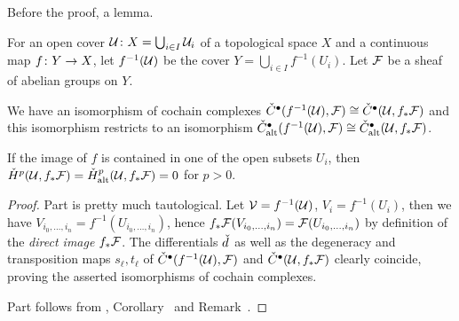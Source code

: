 \documentclass[a4paper,parskip=half,numbers=enddot, DIV=12]{scrreprt}
\begin{document}
Before the proof, a lemma.
\begin{lem}
	For an open cover $\mathcal{U}\colon X=\bigcup_{i\in I}\mathcal{U}_i$ of a topological space $X$ and a continuous map $f\colon Y\morphism X$, let $f^{-1}(\mathcal{U})$ be the cover $Y=\bigcup_{i\in I}f^{-1}(U_i)$. Let $\mathcal{F}$ be a sheaf of abelian groups on $Y$.
	\begin{alphanumerate}
		\item We have an isomorphism of cochain complexes $\check{C}^\bullet (f^{-1}(\mathcal{U}),\mathcal{F})\cong \check{C}^\bullet (\mathcal{U},f_*\mathcal{F})$ and this isomorphism restricts to an isomorphism $\check{C}_{\mathrm{alt}}^\bullet (f^{-1}(\mathcal{U}),\mathcal{F})\cong \check{C}_{\mathrm{alt}}^\bullet (\mathcal{U},f_*\mathcal{F})$.
		\item If the image of $f$ is contained in one of the open subsets $U_i$, then $\check{H}^p(\mathcal{U},f_*\mathcal{F})=\check{H}_{\mathrm{alt}}^p(\mathcal{U},f_*\mathcal{F})=0$ for $p>0$.
	\end{alphanumerate}
\end{lem}
\begin{proof}
	Part  is pretty much tautological. Let $\mathcal{V}=f^{-1}(\mathcal{U})$, $V_i=f^{-1}(U_i)$, then we have $V_{i_0,\ldots,i_n}=f^{-1}(U_{i_0,\ldots,i_n})$, hence $f_*\mathcal{F}(V_{i_0,\ldots,i_n})=\mathcal{F}(U_{i_0,\ldots,i_n})$ by definition of the \emph{direct image} $f_*\mathcal{F}$. The differentials $\check{d}\hspace{0.06125em}$ as well as the degeneracy and transposition maps $s_\ell,t_\ell$ of $\check{C}^\bullet (f^{-1}(\mathcal{U}),\mathcal{F})$ and $\check{C}^\bullet (\mathcal{U},f_*\mathcal{F})$ clearly coincide, proving the asserted isomorphisms of cochain complexes.
	
	Part  follows from , Corollary~ and Remark~.
\end{proof}
\end{document}
